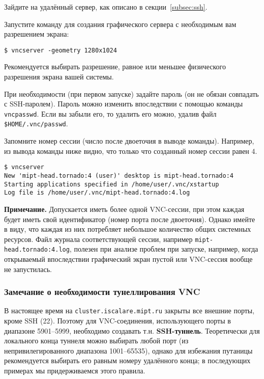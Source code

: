 \begin{enumerate*}
    \item Зайдите на удалённый сервер, как описано в секции~\ref{subsec:ssh}.
    \item Запустите команду для создания графического сервера с необходимым вам разрешением экрана:
\begin{lstlisting}
$ vncserver -geometry 1280x1024
\end{lstlisting}
Рекомендуется выбирать разрешение, равное или меньшее физического разрешения экрана вашей системы.
    \item При необходимости (при первом запуске) задайте пароль (он не обязан совпадать с SSH-паролем). Пароль можно изменить впоследствии с помощью команды \texttt{vncpasswd}. Если вы забыли его, то удалить его можно, удалив файл \texttt{\$HOME/.vnc/passwd}.
    \item Запомните номер сессии (число после двоеточия в выводе команды). Например, из вывода команды ниже видно, что только что созданный номер сессии равен 4.
\begin{lstlisting}
$ vncserver
New 'mipt-head.tornado:4 (user)' desktop is mipt-head.tornado:4
Starting applications specified in /home/user/.vnc/xstartup
Log file is /home/user/.vnc/mipt-head.tornado:4.log
\end{lstlisting}
\textbf{Примечание.} Допускается иметь более одной VNC-сессии, при этом каждая будет иметь свой идентификатор (номер порта после двоеточия). Однако имейте в виду, что каждая из них потребляет небольшое количество общих системных ресурсов.
Файл журнала соответствующей сессии, например \texttt{mipt-head.tornado:4.log}, полезен при анализе проблем при запуске, например, когда открываемый впоследствии графический экран пустой или VNC-сессия вообще не запустилась.
\end{enumerate*}

\subsubsection{Замечание о необходимости тунеллирования VNC}

В настоящее время на \texttt{cluster.iscalare.mipt.ru} закрыты все внешние порты, кроме SSH (22). Поэтому для VNC-соединения, использующего порты в диапазоне 5901--5999, необходимо создавать т.н. \textbf{SSH-туннель}. Теоретически для локального конца туннеля можно выбирать любой порт (из непривилегированного диапазона 1001--65535), однако для избежания путаницы рекомендуется выбирать его равным номеру удалённого конца; в последующих примерах мы придерживаемся этого правила.

